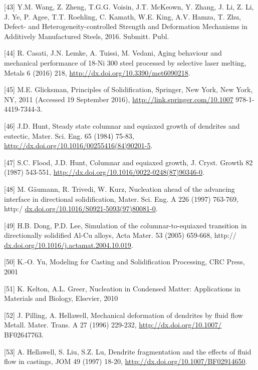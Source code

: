 \documentclass[10pt]{article}
\begin{document}
[43] Y.M. Wang, Z. Zheng, T.G.G. Voisin, J.T. McKeown, Y. Zhang, J. Li, Z. Li, J. Ye, P. Agee, T.T. Roehling, C. Kamath, W.E. King, A.V. Hamza, T. Zhu, Defect- and Heterogeneity-controlled Strength and Deformation Mechanisms in Additively Manufactured Steels, 2016. Submitt. Publ.

[44] R. Casati, J.N. Lemke, A. Tuissi, M. Vedani, Aging behaviour and mechanical performance of 18-Ni 300 steel processed by selective laser melting, Metals 6 (2016) 218, \href{http://dx.doi.org/10.3390/met6090218}{http://dx.doi.org/10.3390/met6090218}.

[45] M.E. Glicksman, Principles of Solidification, Springer, New York, New York, NY, 2011 (Accessed 19 September 2016), \href{http://link.springer.com/10.1007}{http://link.springer.com/10.1007} 978-1-4419-7344-3.

[46] J.D. Hunt, Steady state columnar and equiaxed growth of dendrites and eutectic, Mater. Sci. Eng. 65 (1984) 75-83, \href{http://dx.doi.org/10.1016/00255416(84)90201-5}{http://dx.doi.org/10.1016/00255416(84)90201-5}.

[47] S.C. Flood, J.D. Hunt, Columnar and equiaxed growth, J. Cryst. Growth 82 (1987) 543-551, \href{http://dx.doi.org/10.1016/0022-0248(87)90346-0}{http://dx.doi.org/10.1016/0022-0248(87)90346-0}.

[48] M. Gäumann, R. Trivedi, W. Kurz, Nucleation ahead of the advancing interface in directional solidification, Mater. Sci. Eng. A 226 (1997) 763-769, http:/ \href{http://dx.doi.org/10.1016/S0921-5093(97)80081-0}{dx.doi.org/10.1016/S0921-5093(97)80081-0}.

[49] H.B. Dong, P.D. Lee, Simulation of the columnar-to-equiaxed transition in directionally solidified Al-Cu alloys, Acta Mater. 53 (2005) 659-668, http:// \href{http://dx.doi.org/10.1016/j.actamat.2004.10.019}{dx.doi.org/10.1016/j.actamat.2004.10.019}.

[50] K.-O. Yu, Modeling for Casting and Solidification Processing, CRC Press, 2001

[51] K. Kelton, A.L. Greer, Nucleation in Condensed Matter: Applications in Materials and Biology, Elsevier, 2010

[52] J. Pilling, A. Hellawell, Mechanical deformation of dendrites by fluid flow Metall. Mater. Trans. A 27 (1996) 229-232, \href{http://dx.doi.org/10.1007/}{http://dx.doi.org/10.1007/} BF02647763.

[53] A. Hellawell, S. Liu, S.Z. Lu, Dendrite fragmentation and the effects of fluid flow in castings, JOM 49 (1997) 18-20, \href{http://dx.doi.org/10.1007/BF02914650}{http://dx.doi.org/10.1007/BF02914650}.
\end{document}
